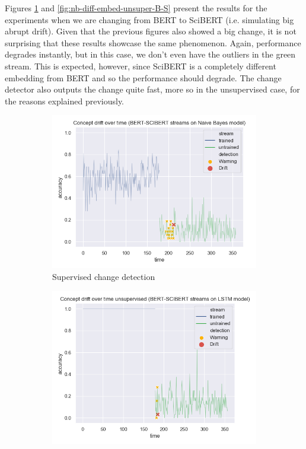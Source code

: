 \documentclass[12pt]{extreport}
\begin{document}
Figures \ref{fig:nb-diff-embed-super-B-S} and \ref{fig:nb-diff-embed-unsuper-B-S} present the results for the experiments when we are changing from BERT to SciBERT (i.e. simulating big abrupt drift). Given that the previous figures also showed a big change, it is not surprising that these results showcase the same phenomenon. Again, performance degrades instantly, but in this case, we don't even have the outliers in the green stream. This is expected, however, since SciBERT is a completely different embedding from BERT and so the performance should degrade. The change detector also outputs the change quite fast, more so in the unsupervised case, for the reasons explained previously.

\begin{figure}[H]
\centering
\begin{subfigure}{.5\textwidth}
  \centering
  \includegraphics[width=\linewidth]{assets/detecting-change/diff_embed_nb_wos_1_BERT_SCIBERT.png}
  \caption{Supervised change detection}
  \label{fig:nb-diff-embed-super-B-S}
\end{subfigure}%
\begin{subfigure}{.5\textwidth}
  \centering
  \includegraphics[width=\linewidth]{assets/detecting-change/diff_embed_nb_wos_1_BERT_SCIBERT_unsupervised.png}

\end{subfigure}
\end{figure}
\end{document}
